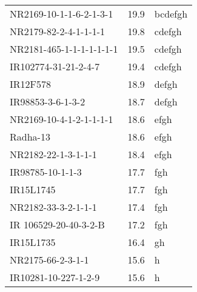 \documentclass[]{article}
\begin{document}
\begin{longtable}{lll}
NR2169-10-1-1-6-2-1-3-1 & 19.9 & bcdefgh\\
\rowcolor{gray!6}  NR2179-82-2-4-1-1-1-1 & 19.8 & cdefgh\\
NR2181-465-1-1-1-1-1-1-1 & 19.5 & cdefgh\\
\addlinespace
\rowcolor{gray!6}  IR102774-31-21-2-4-7 & 19.4 & cdefgh\\
IR12F578 & 18.9 & defgh\\
\rowcolor{gray!6}  IR98853-3-6-1-3-2 & 18.7 & defgh\\
NR2169-10-4-1-2-1-1-1-1 & 18.6 & efgh\\
\rowcolor{gray!6}  Radha-13 & 18.6 & efgh\\
\addlinespace
NR2182-22-1-3-1-1-1 & 18.4 & efgh\\
\rowcolor{gray!6}  IR98785-10-1-1-3 & 17.7 & fgh\\
IR15L1745 & 17.7 & fgh\\
\rowcolor{gray!6}  NR2182-33-3-2-1-1-1 & 17.4 & fgh\\
IR 106529-20-40-3-2-B & 17.2 & fgh\\
\addlinespace
\rowcolor{gray!6}  IR15L1735 & 16.4 & gh\\
NR2175-66-2-3-1-1 & 15.6 & h\\
\rowcolor{gray!6}  IR10281-10-227-1-2-9 & 15.6 & h\\
\bottomrule
\end{longtable}
\endgroup{}
\begingroup\fontsize{12}{14}\selectfont
\end{document}

